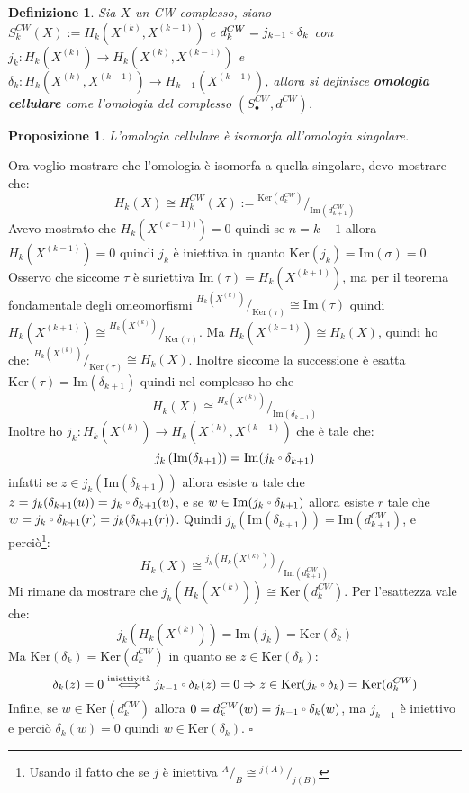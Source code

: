 \documentclass[10pt, twoside=false, x11names]{scrbook}
\newtheorem{proposition}[theorem]{Proposizione}
\newtheorem{definition}[theorem]{Definizione}
\newenvironment{proof}{{\textbf{Dimostrazione}:}}{\hfill $\square$}
\newcommand{\im}[1]{\mathrm{Im}( #1 )}
\renewcommand{\ker}[1]{\mathrm{Ker}( #1)}
\newcommand*\quot[2]{{^{\textstyle #1}\big/_{\textstyle #2}}}
\let\latexcirc=\circ
\newcommand{\ccirc}{\mathbin{\mathchoice
  {\xcirc\scriptstyle}
  {\xcirc\scriptstyle}
  {\xcirc\scriptscriptstyle}
  {\xcirc\scriptscriptstyle}
}}
\newcommand{\xcirc}[1]{\vcenter{\hbox{$#1\latexcirc$}}}
\let\circ\ccirc
\begin{document}
\begin{definition}
  Sia $ X $ un CW complesso, siano $ S_k^{CW}(X) := H_k(X^{(k)}, X^{(k-1)}) $ e $ d_k^{CW} = j_{k-1} \circ \delta_k $
  con $ j_k \colon H_k(X^{(k)}) \to H_k(X^{(k)}, X^{(k-1)}) $ e $ \delta_k \colon H_k(X^{(k)}, X^{(k-1)}) \to  H_{k-1}(X^{(k-1)})  $,
  allora si definisce \textbf{omologia cellulare}
  come l'omologia del complesso $ (S_\bullet^{CW}, d^{CW}) $.
\end{definition}

\begin{proposition}
  L'omologia cellulare è isomorfa all'omologia singolare.
\end{proposition}
\begin{proof}
  Ora voglio mostrare che l'omologia è isomorfa a quella singolare, devo mostrare
  che:
  \[
    H_k(X) \cong H^{CW}_k(X) := \quot{\ker{d_k^{CW}}}{\im{d_{k+1}^{CW}}}
  \]
  Avevo mostrato che
  $ H_k(X^{(k-1))}) = 0 $ quindi se $ n = k - 1 $ allora $ H_k(X^{(k-1)}) = 0 $ quindi
  $ j_k $ è iniettiva in quanto $ \ker{j_k} = \im{\sigma} = 0 $.
  Osservo che siccome $ \tau $ è suriettiva $ \im{\tau} = H_k(X^{(k+1)}) $, ma per
  il teorema fondamentale degli omeomorfismi $ \quot{H_k(X^{(k)})}{\ker{\tau}} \cong \im{\tau} $
  quindi $ H_k(X^{(k+1)}) \cong \quot{H_k(X^{(k)})}{\ker{\tau}} $. Ma $ H_k(X^{(k+1)}) \cong H_k(X) $,
  quindi ho che: $ \quot{H_k(X^{(k)})}{\ker{\tau}} \cong H_k(X) $. Inoltre siccome
  la successione è esatta $ \ker{\tau} = \im{\delta_{k+1}} $ quindi
  nel complesso ho che
  \[
    H_k(X) \cong \quot{H_k(X^{(k)})}{\im{\delta_{k+1}}}
  \]
  Inoltre ho $ j_k \colon H_k(X^{(k)}) \to H_k(X^{(k)}, X^{(k-1)}) $ che è tale che:
  \[
    j_k\left(\im{\delta_{k+1}}\right) = \im{j_k \circ \delta_{k+1}}
  \]
  infatti se $ z \in j_k\left(\im{\delta_{k+1}}\right) $ allora esiste $ u $ tale che
  $ z = j_k(\delta_{k+1}(u)) = j_k \circ \delta_{k+1}(u) $, e se $ w \in \im{j_k \circ \delta_{k+1}} $ allora esiste $ r $ tale che
  $ w = j_k \circ \delta_{k+1}(r) = j_k(\delta_{k+1}(r)) $.
  Quindi $ j_k\left(\im{\delta_{k+1}}\right) = \im{d_{k+1}^{CW}} $, e perciò\footnote{Usando il fatto che se
  $ j $ è iniettiva $ \quot{A}{B} \cong \quot{j(A)}{j(B)} $}:
  \[
    H_k(X) \cong \quot{j_k\left(H_k(X^{(k)})\right)}{\im{d^{CW}_{k+1}}}
  \]
  Mi rimane da mostrare che $ j_k\left(H_k(X^{(k)})\right) \cong \ker{d_k^{CW}} $.
  Per l'esattezza vale che:
  \[
    j_k\left(H_k(X^{(k)})\right) = \im{j_k} = \ker{\delta_k}
  \]
  Ma $ \ker{\delta_k} = \ker{d_k^{CW}} $ in quanto se $ z \in \ker{\delta_k} $:
  \[
    \delta_k(z) = 0 \overset{\text{iniettività}}{\iff} j_{k-1} \circ \delta_k(z) = 0 \Rightarrow z \in \ker{j_k \circ \delta_k} = \ker{d_k^{CW}}
  \]
  Infine, se $ w \in \ker{d_k^{CW}} $ allora $ 0 = d_k^{CW}(w) = j_{k-1} \circ \delta_k (w) $,
  ma $ j_{k-1} $ è iniettivo e perciò $ \delta_k(w) = 0 $ quindi $ w \in \ker{\delta_k} $.
\end{proof}
\end{document}
